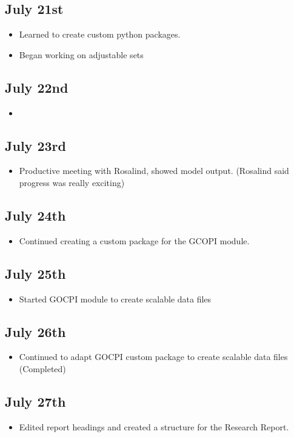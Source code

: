 \documentclass[12pt]{article}
\begin{document}
\subsection{July 21st}
\begin{itemize}
	\item Learned to create custom python packages.
	\item Began working on adjustable sets
\end{itemize}
\subsection{July 22nd}
\begin{itemize}
	\item 
\end{itemize}
\subsection{July 23rd}
\begin{itemize}
	\item Productive meeting with Rosalind, showed model output. (Rosalind said progress was really exciting)
\end{itemize}
\subsection{July 24th}
\begin{itemize}
	\item Continued creating a custom package for the GCOPI module.
\end{itemize}
\subsection{July 25th}
\begin{itemize}
	\item Started GOCPI module to create scalable data files
\end{itemize}
\subsection{July 26th}
\begin{itemize}
	\item Continued to adapt GOCPI custom package to create scalable data files (Completed)
\end{itemize}
\subsection{July 27th}
\begin{itemize}
	\item Edited report headings and created a structure for the Research Report.
\end{itemize}
\end{document}
